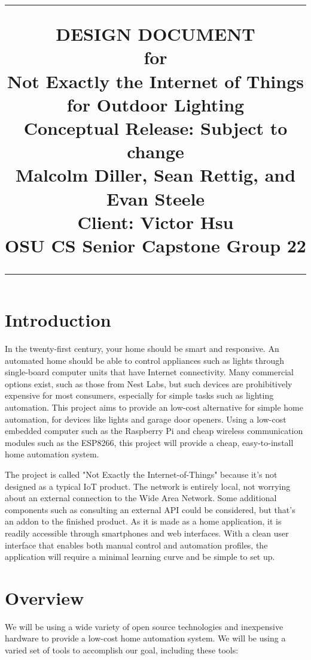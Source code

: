 \documentclass[oneside,openright]{book}
\title{
	\flushright
		\rule{16cm}{5pt}\vskip1cm
		\Huge{DESIGN DOCUMENT}\\
	for\\
		\vspace{2cm}
	Not Exactly the Internet of Things for Outdoor Lighting\\
		\vspace{2cm}
	\LARGE{Conceptual Release:}
	\vspace{2cm}
	\LARGE{Subject to change\\}
	\vspace{2cm}
	Malcolm Diller, Sean Rettig, and Evan Steele\\
        Client: Victor Hsu\\
        OSU CS Senior Capstone Group 22
		\vfill
		\rule{16cm}{5pt}
}
\date{}
\begin{document}
\maketitle
\tableofcontents
\newpage

\section{Introduction}

In the twenty-first century, your home should be smart and responsive. An
automated home should be able to control appliances such as lights through
single-board computer units that have Internet connectivity. Many commercial
options exist, such as those from Nest Labs, but such devices are prohibitively
expensive for most consumers, especially for simple tasks such as lighting
automation. This project aims to provide an low-cost alternative for simple
home automation, for devices like lights and garage door openers. Using a
low-cost embedded computer such as the Raspberry Pi and cheap wireless
communication modules such as the ESP8266, this project will provide a cheap,
easy-to-install home automation system.

The project is called "Not Exactly the Internet-of-Things" because it's not
designed as a typical IoT product. The network is entirely local, not worrying
about an external connection to the Wide Area Network. Some additional
components such as consulting an external API could be considered, but that's
an addon to the finished product. As it is made as a home application, it is
readily accessible through smartphones and web interfaces. With a clean user
interface that enables both manual control and automation profiles, the
application will require a minimal learning curve and be simple to set up.  

\section{Overview}

We will be using a wide variety of open source technologies and inexpensive
hardware to provide a low-cost home automation system. We will be using a
varied set of tools to accomplish our goal, including these tools:
\end{document}
